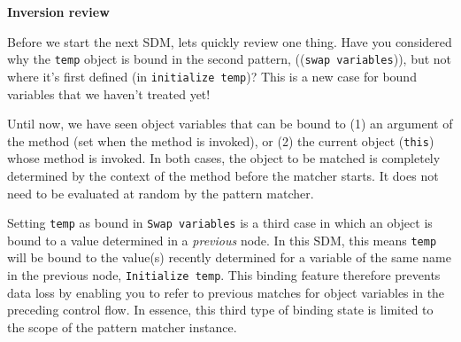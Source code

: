 \newpage
\genHeader
\hypertarget{invert close}{}

{\Large \bf Inversion review}

Before we start the next SDM, lets quickly review one thing. Have you considered why the \texttt{temp} object is bound in the second pattern,
((\texttt{swap variables})), but not where it's first defined (in \texttt{initialize temp})? This is a new case for bound variables that we haven't treated
yet!

Until now, we have seen object variables that can be bound to (1) an argument of the method (set when the method is invoked), or (2) the
current object (\texttt{this}) whose method is invoked. In both cases, the object to be matched is completely determined by the context of the method before
the matcher starts. It does not need to be evaluated at random by the pattern matcher.

Setting \texttt{temp} as bound in \texttt{Swap variables} is a third case in which an object is bound to a value determined in a \emph{previous} node. In
this SDM, this means \texttt{temp} will be bound to the value(s) recently determined for a variable of the same name in the previous node, \texttt{Initialize
temp}. This binding feature therefore prevents data loss by enabling you to refer to previous matches for object variables in the preceding control flow. In
essence, this third type of binding state is limited to the scope of the pattern matcher instance.
